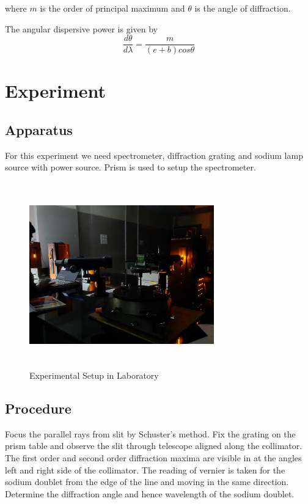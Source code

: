 \documentclass[a4paper, amsfonts, amssymb, amsmath, reprint, showkeys, nofootinbib, twoside]{revtex4-1}
\begin{document}
where $m$ is the order of principal maximum and $\theta$ is the angle of diffraction.

The angular dispersive power is given by 
\begin{equation}
	\frac{d\theta}{d\lambda}=\frac{m}{(e+b)cos\theta}
\end{equation}
\section{Experiment}
\subsection{Apparatus}
For this experiment we need spectrometer, diffraction grating and sodium lamp source with power source. Prism is used to setup the spectrometer.

\begin{figure}[H] %
	\centering
	\includegraphics[width=8cm, height=8cm]{2} 
	\caption{Experimental Setup in Laboratory}
	\label{1}
\end{figure}
\subsection{Procedure}

Focus the parallel rays from slit by Schuster's method. Fix the grating on the prism table and observe the slit through telescope aligned along the collimator. The first order and second order diffraction maxima are visible in at the angles left and right side of the collimator. The reading of vernier is taken for the sodium doublet from the edge of the line and moving in the same direction.  Determine the diffraction angle and hence wavelength of the sodium doublet.
\end{document}
